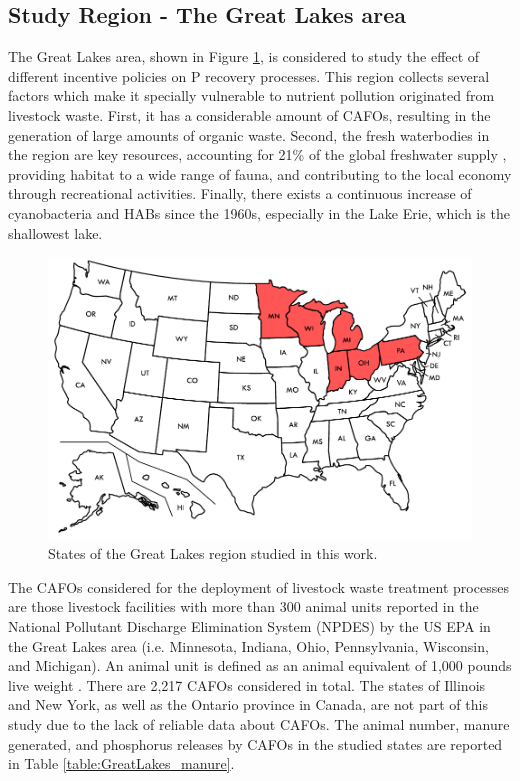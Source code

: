 \begin{refsection}[referencesCh5]
\subsection{Study Region - The Great Lakes area}
The Great Lakes area, shown in Figure \ref{fig:states}, is considered to study the effect of different incentive policies on P recovery processes. This region collects several factors which make it specially vulnerable to nutrient pollution originated from livestock waste. First, it has a considerable amount of CAFOs, resulting in the generation of large amounts of organic waste. Second, the fresh waterbodies in the region are key resources, accounting for 21\% of the global freshwater supply \citep{freshwater_Great_Lakes}, providing habitat to a wide range of fauna, and contributing to the local economy through recreational activities. Finally, there exists a continuous increase of cyanobacteria and HABs since the 1960s, especially in the Lake Erie, which is the shallowest lake.

\begin{figure}[h]
	\centering
	\includegraphics[width=0.65\linewidth, trim={0cm 0cm 0cm 0cm},clip]{gfx/Chapter5/Blank_US_map_borders_labels.pdf} 
	\caption{States of the Great Lakes region studied in this work.}
	\label{fig:states}
\end{figure}

The CAFOs considered for the deployment of livestock waste treatment processes are those livestock facilities with more than 300 animal units \citep{CAFO_definition} reported in the National Pollutant Discharge Elimination System (NPDES) by the US EPA in the Great Lakes area (i.e. Minnesota, Indiana, Ohio, Pennsylvania, Wisconsin, and Michigan). An animal unit is defined as an animal equivalent of 1,000 pounds live weight \citep{animal_unit_definition}. There are 2,217 CAFOs considered in total. The states of Illinois and New York, as well as the Ontario province in Canada, are not part of this study due to the lack of reliable data about CAFOs. The animal number, manure generated, and phosphorus releases by CAFOs in the studied states are reported in Table \ref{table:GreatLakes_manure}.


\end{refsection}
